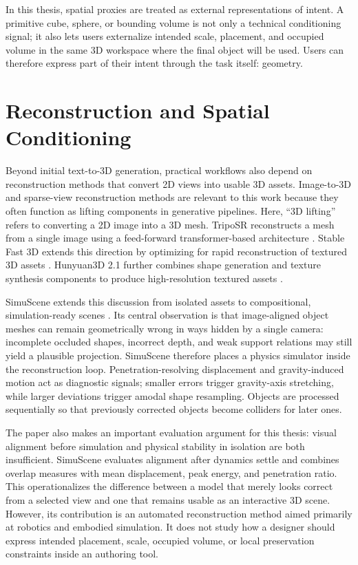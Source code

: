 \documentclass[11pt]{report}
\begin{document}
In this thesis, spatial proxies are treated as external representations of intent. A primitive cube, sphere, or bounding volume is not only a technical conditioning signal; it also lets users externalize intended scale, placement, and occupied volume in the same 3D workspace where the final object will be used. Users can therefore express part of their intent through the task itself: geometry.

\section{Reconstruction and Spatial Conditioning}
\label{sec:rw-conditional-control}
Beyond initial text-to-3D generation, practical workflows also depend on reconstruction methods that convert 2D views into usable 3D assets. Image-to-3D and sparse-view reconstruction methods are relevant to this work because they often function as lifting components in generative pipelines. Here, ``3D lifting'' refers to converting a 2D image into a 3D mesh. TripoSR reconstructs a mesh from a single image using a feed-forward transformer-based architecture \cite{tochilkin2024triposr}. Stable Fast 3D extends this direction by optimizing for rapid reconstruction of textured 3D assets \cite{boss2024sf3d}. Hunyuan3D 2.1 further combines shape generation and texture synthesis components to produce high-resolution textured assets \cite{hunyuan3d2025}.

SimuScene extends this discussion from isolated assets to compositional, simulation-ready scenes \cite{lee2026simuscene}. Its central observation is that image-aligned object meshes can remain geometrically wrong in ways hidden by a single camera: incomplete occluded shapes, incorrect depth, and weak support relations may still yield a plausible projection. SimuScene therefore places a physics simulator inside the reconstruction loop. Penetration-resolving displacement and gravity-induced motion act as diagnostic signals; smaller errors trigger gravity-axis stretching, while larger deviations trigger amodal shape resampling. Objects are processed sequentially so that previously corrected objects become colliders for later ones.

The paper also makes an important evaluation argument for this thesis: visual alignment before simulation and physical stability in isolation are both insufficient. SimuScene evaluates alignment after dynamics settle and combines overlap measures with mean displacement, peak energy, and penetration ratio. This operationalizes the difference between a model that merely looks correct from a selected view and one that remains usable as an interactive 3D scene. However, its contribution is an automated reconstruction method aimed primarily at robotics and embodied simulation. It does not study how a designer should express intended placement, scale, occupied volume, or local preservation constraints inside an authoring tool.
\end{document}
